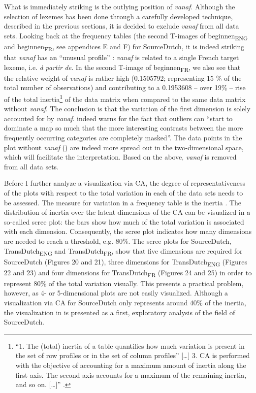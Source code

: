 What is immediately striking is the outlying position of \textit{vanaf}. Although the selection of lexemes has been done through a carefully developed technique, described in the previous sections, it is decided to exclude \textit{vanaf} from all data sets. Looking back at the frequency tables (the second T-images of beginnen\textsubscript{ENG} and beginnen\textsubscript{FR}, see appendices E and F) for SourceDutch, it is indeed striking that \textit{vanaf} has an “unusual profile” \citep[92]{greenacre_correspondence_2007}: \textit{vanaf} is related to a single French target lexeme, i.e. \textit{à} \textit{partir} \textit{de}. In the second T-image of beginnen\textsubscript{FR}, we also see that the relative weight of \textit{vanaf} is rather high (0.1505792; representing 15 \% of the total number of observations) and contributing to a 0.1953608 – over 19\% – rise of the total inertia\footnote{“1. The (total) inertia of a table quantifies how much variation is present in the set of row profiles or in the set of column profiles” […] 3. CA is performed with the objective of accounting for a maximum amount of inertia along the first axis. The second axis accounts for a maximum of the remaining inertia, and so on. […]” \citep[88]{greenacre_correspondence_2007}.} of the data matrix when compared to the same data matrix without \textit{vanaf}. The conclusion is that the variation of the first dimension is solely accounted for by \textit{vanaf}. \citet[92]{greenacre_correspondence_2007} indeed warns for the fact that outliers can “start to dominate a map so much that the more interesting contrasts between the more frequently occurring categories are completely masked”. The data points in the plot without \textit{vanaf} () are indeed more spread out in the two-dimensional space, which will facilitate the interpretation. Based on the above, \textit{vanaf} is removed from all data sets.

Before I further analyze a visualization via CA, the degree of representativeness of the plots with respect to the total variation in each of the data sets needs to be assessed. The measure for variation in a frequency table is the inertia \citep{greenacre_correspondence_2007}. The distribution of inertia over the latent dimensions of the CA can be visualized in a so-called scree plot: the bars show how much of the total variation is associated with each dimension. Consequently, the scree plot indicates how many dimensions are needed to reach a threshold, e.g. 80\%. The scree plots for SourceDutch, TransDutch\textsubscript{ENG} and TransDutch\textsubscript{FR}, show that five dimensions are required for SourceDutch (Figures 20 and 21), three dimensions for TransDutch\textsubscript{ENG} (Figures 22 and 23) and four dimensions for TransDutch\textsubscript{FR} (Figures 24 and 25) in order to represent 80\% of the total variation visually. This presents a practical problem, however, as 4- or 5-dimensional plots are not easily visualized. Although a visualization via CA for SourceDutch only represents around 40\% of the inertia, the visualization in  is presented as a first, exploratory analysis of the field of SourceDutch.

